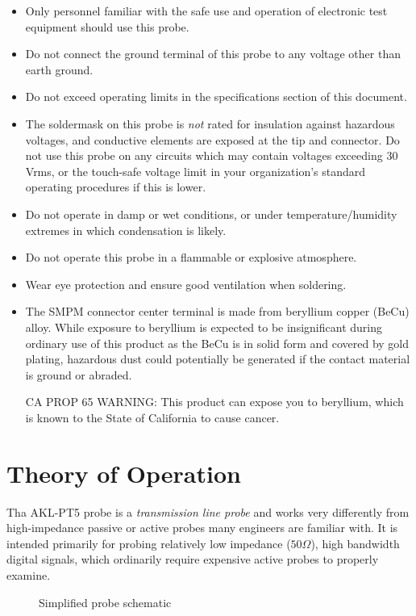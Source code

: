 \documentclass[11pt]{article}
\begin{document}
\begin{itemize}
\item Only personnel familiar with the safe use and operation of electronic test equipment should use this probe.
\item Do not connect the ground terminal of this probe to any voltage other than earth ground.
\item Do not exceed operating limits in the specifications section of this document.
\item The soldermask on this probe is \emph{not} rated for insulation against hazardous voltages, and conductive
elements are exposed at the tip and connector. Do not use this probe on any circuits which may contain voltages
exceeding 30 Vrms, or the touch-safe voltage limit in your organization's standard operating procedures if this is
lower.
\item Do not operate in damp or wet conditions, or under temperature/humidity extremes in which condensation is
likely.
\item Do not operate this probe in a flammable or explosive atmosphere.
\item Wear eye protection and ensure good ventilation when soldering.
\item The SMPM connector center terminal is made from beryllium copper (BeCu) alloy. While exposure to beryllium is
expected to be insignificant during ordinary use of this product as the BeCu is in solid form and covered by gold
plating, hazardous dust could potentially be generated if the contact material is ground or abraded.

CA PROP 65 WARNING: This product can expose you to beryllium, which is known to the State of California to cause cancer.
\end{itemize}

\pagebreak
\section{Theory of Operation}

Tha AKL-PT5 probe is a \emph{transmission line probe} and works very differently from high-impedance passive or active
probes many engineers are familiar with. It is intended primarily for probing relatively low impedance ($50 \Omega$),
high bandwidth digital signals, which ordinarily require expensive active probes to properly examine.

\begin{figure}[h]
\centering
\caption{Simplified probe schematic}
\label{schematic}
\end{figure}
\end{document}
